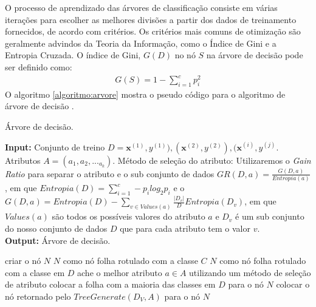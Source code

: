 O processo de aprendizado das árvores de classificação consiste em várias iterações para escolher as melhores divisões a partir dos dados de treinamento fornecidos, de acordo com critérios. Os critérios mais comuns de otimização são
geralmente advindos da Teoria da Informação, como o Índice de Gini e a Entropia Cruzada.
O índice de Gini, $G(D)$ no nó $S$ na árvore de decisão pode ser definido como:
\begin{gather*}
    G(S) = 1 - \sum_{i=1}^cp_i^2
\end{gather*}
O algoritmo \ref{algoritmo:arvore} mostra o pseudo código para o algoritmo de árvore de decisão \cite{tree:algor:risk}.
\begin{algorithm}[H]
\caption{Árvore de decisão.\label{algoritmo:arvore}}
\textbf{Input:} Conjunto de treino $D=\mathbf{x}^{(1)},y^{(1)}),(\mathbf{x}^{(2)},y^{(2)}),(\mathbf{x}^{(i)},y^{(j)}$. Atributos $A=(a_1,a_2,..._a_k)$. Método de seleção do atributo: Utilizaremos o \textit{Gain Ratio} para separar o atributo e o sub conjunto de dados $GR(D,a)=\frac{G(D,a)}{Entropia(a)}$, em que $Entropia(D)= \sum_{i=1}^c-p_ilog_2p_i$ e o $G(D,a)=Entropia(D) - \sum_{v\in Values(a)}^{} \frac{|D_v|}{D}Entropia(D_v)$, em que $Values(a)$ são todos os possíveis valores do atributo $a$ e $D_v$ é um sub conjunto do nosso conjunto de dados $D$ que para cada atributo tem o valor $v$.\\
\textbf{Output:} Árvore de decisão. \\
\begin{algorithmic}[1]
\State criar o nó $N$
\State \Return $N$ como nó folha rotulado com a classe $C$
\EndIf
{}
\State \Return $N$ como nó folha rotulado com a classe em $D$
\EndIf
\State ache o melhor atributo $a\in A$ utilizando um método de seleção de atributo
\State {}
\State colocar a folha com a maioria das classes em $D$ para o nó $N$
\Else
\State colocar o nó retornado pelo $TreeGenerate(D_V,A)$ para o nó $N$
\EndIf
\EndFor
\end{algorithmic}
\end{algorithm}


